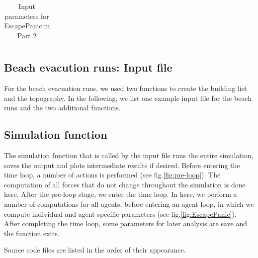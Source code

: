 \documentclass[11pt]{article}
\begin{document}
\begin{appendix}
\begin{table}
\begin{tabular}{l l l}
\hline

\hline
\end{tabular}
\label{tab:input2}
\caption{Input parameters for EscapePanic.m Part 2}
\end{table}
\begin{landscape}

\end{landscape}

\subsection{Beach evacution runs: Input file}\label{sec:input_file}
For the beach evacuation runs, we used two functions to create the building list and the topography. In the following, we list one example input file for the beach runs and the two additional functions.
\begin{landscape}



\end{landscape}
\subsection{Simulation function}
The simulation function that is called by the input file runs the entire simulation, saves the output and plots intermediate results if desired. Before entering the time loop, a number of actions is performed (see fig.\ref{fig:pre-loop}). The computation of all forces that do not change throughout the simulation is done here. After the pre-loop stage, we enter the time loop. In here, we perform a number of computations for all agents, before entering an agent loop, in which we compute individual and agent-specific parameters (see fig.\ref{fig:EscapePanic}). After completing the time loop, some parameters for later analysis are save and the function exits. 

Source code files are listed in the order of their appearance.
\begin{landscape}


















\end{landscape}


\end{appendix}
\end{document}
